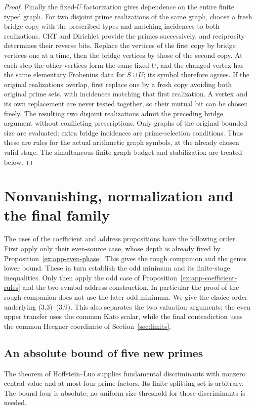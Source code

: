 \documentclass[11pt]{article}
\theoremstyle{definition}
\theoremstyle{remark}
\begin{document}
\begin{proof}
Finally the fixed-$U$ factorization gives dependence on the entire
finite typed graph. For two disjoint prime realizations of the same
graph, choose a fresh bridge copy with the prescribed types and
matching incidences to both realizations. CRT and Dirichlet provide
the primes successively, and reciprocity determines their reverse
bits. Replace the vertices of the first copy by bridge vertices one
at a time, then the bridge vertices by those of the second copy.
At each step the other vertices form the same fixed $U$, and the
changed vertex has the same elementary Frobenius data for $S\cup U$;
its symbol therefore agrees. If the original realizations overlap,
first replace one by a fresh copy avoiding both original prime sets,
with incidences matching that first realization. A vertex and its
own replacement are never tested together, so their mutual bit can
be chosen freely. The resulting two disjoint realizations admit the
preceding bridge argument without conflicting prescriptions.
Only graphs of the original bounded size are evaluated; extra bridge
incidences are prime-selection conditions. Thus these are rules for
the actual arithmetic graph symbols, at the already chosen valid
stage. The simultaneous finite graph budget and stabilization are
treated below.
\end{proof}



\section{Nonvanishing, normalization and the final family}\label{app:endpoints}
The uses of the coefficient and address propositions have the following
order. First apply only their even-source case, whose depth is already
fixed by Proposition~\ref{ex:app-even-phase}. This gives the rough
companion and the genus lower bound. These in turn establish the odd
minimum and its finite-stage inequalities. Only then apply the odd
case of Proposition~\ref{ex:app-coefficient-rules} and the two-symbol
address construction. In particular the proof of the rough companion
does not use the later odd minimum.
We give the choice order underlying (3.3)--(3.9). This also separates
the two valuation arguments: the even upper transfer uses the common
Kato scalar, while the final contradiction uses the common Heegner
coordinate of Section~\ref{sec:limits}.

\subsection{An absolute bound of five new primes}
The theorem of Hoffstein--Luo \cite[p.~436]{hl} supplies fundamental
discriminants with nonzero central value and at most four prime
factors. Its finite splitting set is arbitrary. The bound four is
absolute; no uniform size threshold for those discriminants is needed.
\end{document}

